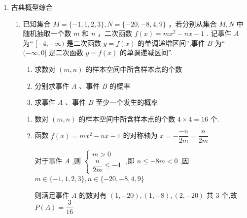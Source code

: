 \begin{enumerate}
\begin{enumerate}
\begin{jieda}
\begin{enumerate}
                由题意可知,事件 $C\text{ 、 }D$ 相互独立,
                
                则小明、小华两人恰有一人通过面试的事件记为 $E$ ，
                
                则概率为 $P\left( E\right)  = P\left( {D\bar{C} + \bar{D}C}\right)  = P\left( {D\bar{C}}\right)  + P\left( {\bar{D}C}\right)  = \dfrac{81}{125} \times  \dfrac{1}{3} + \dfrac{44}{125} \times  \dfrac{2}{3} = \dfrac{169}{375}$
            \end{enumerate}
        \end{jieda}
    \end{enumerate}
    \item 古典概型综合
    \begin{enumerate}
        \item 已知集合 $M = \{  - 1,1,2,3\} ,N = \{  - {20}, - 8,4,9\}$ ，若分别从集合 $M,N$ 中随机抽取一个数 $m$ 和 $n$ ，二次函数 $f\left( x\right)  = m{x}^{2} - {nx} - 1$ . 记事件 $A$ 为“ $\lbrack  - 4, + \infty )$ 是二次函数 $y = f\left( x\right)$ 的单调递增区间”,事件 $B$ 为“ $( - \infty ,0\rbrack$ 是二次函数 $y = f\left( x\right)$ 的单调递减区间”.
        \begin{enumerate}
            \item 求数对 $\left( {m,n}\right)$ 的样本空间中所含样本点的个数
            \item 分别求事件 $A$ 、事件 $B$ 的概率
            \item 求事件 $A$ 、事件 $B$ 至少一个发生的概率
        \end{enumerate}
        \begin{jieda}
            \begin{enumerate}
                \item 数对 $\left( {m,n}\right)$ 的样本空间中所含样本点的个数 $4 \times  4 = {16}$ 个.
                \item 函数 $f\left( x\right)  = m{x}^{2} - {nx} - 1$ 的对称轴为 $x =  - \dfrac{-n}{2m} = \dfrac{n}{2m}$
                
                对于事件 $A$ ,则 $\left\{  \begin{matrix} m > 0 \\  \dfrac{n}{2m} \leq   - 4 \end{matrix}\right.$ ,即 $n \leq   - {8m} < 0$ ,因 $m \in  \{  - 1,1,2,3\} ,n \in  \{  - {20}, - 8,4,9\}$
                
                则满足事件 ${A}$ 的数对有 $\left( {1, - {20}}\right) ,\left( {1, - 8}\right) ,\left( {2, - {20}}\right)$ 共 3 个,故 $P\left({A}\right)  = \dfrac{3}{16}$
                

\end{enumerate}
\end{jieda}
\end{enumerate}
\end{enumerate}
